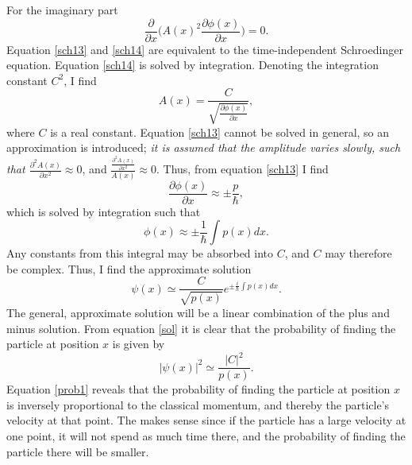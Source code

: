 For the imaginary part
\begin{equation}
	\frac{\partial}{\partial x}\bigg(A(x)^2\frac{\partial \phi(x)}{\partial x}\bigg)=0.
	\label{sch14}
\end{equation} 
Equation \eqref{sch13} and \eqref{sch14} are equivalent to the time-independent Schroedinger equation. Equation \eqref{sch14} is solved by integration. Denoting the integration constant $C^2$, I find
\begin{equation}
	A(x)=\frac{C}{\sqrt{\frac{\partial \phi(x)}{\partial x}}},
	\label{A(x)}
\end{equation} 
where $C$ is a real constant. Equation \eqref{sch13} cannot be solved in general, so an approximation is introduced; \emph{it is assumed that the amplitude varies slowly, such that $\frac{\partial^2A(x)}{\partial x^2}\approx0$}, and $\frac{\frac{\partial^2A(x)}{\partial x^2}}{A(x)}\approx0$. Thus, from equation \eqref{sch13} I find
\begin{equation}
	\frac{\partial\phi(x)}{\partial x}\approx\pm\frac{p}{\hbar},
	\label{sch15}
\end{equation} 
which is solved by integration such that
\begin{equation}
	\phi(x)\approx\pm\frac{1}{\hbar}\int p(x)dx.
	\label{phi(x)}
\end{equation} 
Any constants from this integral may be absorbed into $C$, and $C$ may therefore be complex. Thus, I find the approximate solution
\begin{equation}
	\psi(x)\simeq\frac{C}{\sqrt{p(x)}}e^{\pm\frac{i}{\hbar}\int p(x)dx}.
	\label{sol}
\end{equation} 
The general, approximate solution will be a linear combination of the plus and minus solution. From equation \eqref{sol} it is clear that the probability of finding the particle at position $x$ is given by
\begin{equation}
	|\psi(x)|^2\simeq\frac{|C|^2}{p(x)}.
	\label{prob1}
\end{equation} 
Equation \eqref{prob1} reveals that the probability of finding the particle at position $x$ is inversely proportional to the classical momentum, and thereby the particle's velocity at that point. The makes sense since if the particle has a large velocity at one point, it will not spend as much time there, and the probability of finding the particle there will be smaller.

